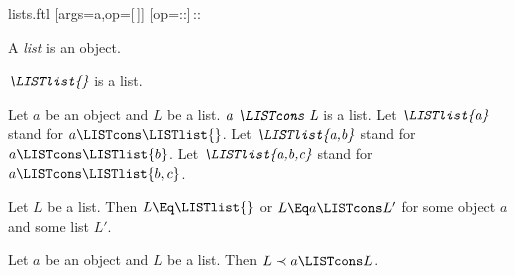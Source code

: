 \documentclass{stex}
\begin{document}
\begin{smodule}{lists.ftl}
[args=a,op=[\,]]{}
[op=::]{\,{::}\,}

\begin{signature}[forthel]
  A \emph{list} is an object.
\end{signature}

\begin{signature}[forthel]
  $\emph{\LISTlist{}}$ is a list.
\end{signature}

\begin{signature}[forthel]
  Let $a$ be an object and $L$ be a list.
  $\emph{a \LISTcons L}$ is a list.
  Let $\emph{\LISTlist{a}}$ stand for $a \LISTcons \LISTlist{}$.
  Let $\emph{\LISTlist{a,b}}$ stand for $a \LISTcons \LISTlist{b}$.
  Let $\emph{\LISTlist{a,b,c}}$ stand for $a \LISTcons \LISTlist{b,c}$.
\end{signature}

\begin{axiom}[forthel]
  Let $L$ be a list.
  Then $L \Eq \LISTlist{}$ or $L \Eq a \LISTcons L'$ for some object $a$ and some list $L'$.
\end{axiom}

\begin{axiom}[forthel]
  Let $a$ be an object and $L$ be a list.
  Then $L \prec a \LISTcons L$.
\end{axiom}
\end{smodule}
\end{document}
